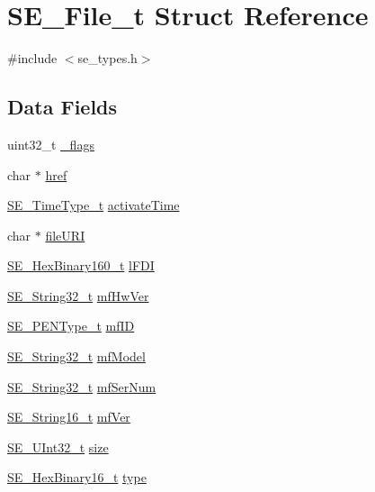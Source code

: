 \hypertarget{structSE__File__t}{}\section{S\+E\+\_\+\+File\+\_\+t Struct Reference}
\label{structSE__File__t}


{\ttfamily \#include $<$se\+\_\+types.\+h$>$}

\subsection*{Data Fields}
\begin{DoxyCompactItemize}
\item 
uint32\+\_\+t \hyperlink{group__File_gaf9fb522b583f585ebfa63bf9aae654c4}{\+\_\+flags}
\item 
char $\ast$ \hyperlink{group__File_ga4f649ba81f3ec3758585c829bffe909e}{href}
\item 
\hyperlink{group__TimeType_ga6fba87a5b57829b4ff3f0e7638156682}{S\+E\+\_\+\+Time\+Type\+\_\+t} \hyperlink{group__File_ga10cf0e5d17ce214712253641b664a0a4}{activate\+Time}
\item 
char $\ast$ \hyperlink{group__File_ga291723dcc840904ef8ca0ee385c935a3}{file\+U\+RI}
\item 
\hyperlink{group__HexBinary160_ga92b92aa55555bdb75f3a59060f2c1632}{S\+E\+\_\+\+Hex\+Binary160\+\_\+t} \hyperlink{group__File_ga74ca6e064ee6671f42955d17470e25b2}{l\+F\+DI}
\item 
\hyperlink{group__String32_gac9f59b06b168b4d2e0d45ed41699af42}{S\+E\+\_\+\+String32\+\_\+t} \hyperlink{group__File_ga1cd1a18ab1e17b4a045bebf80d68eaeb}{mf\+Hw\+Ver}
\item 
\hyperlink{group__PENType_ga75343bbeec563c431fef2977b4dfa4e9}{S\+E\+\_\+\+P\+E\+N\+Type\+\_\+t} \hyperlink{group__File_gadfaca088f863cdcf43485a271a8a481a}{mf\+ID}
\item 
\hyperlink{group__String32_gac9f59b06b168b4d2e0d45ed41699af42}{S\+E\+\_\+\+String32\+\_\+t} \hyperlink{group__File_ga5e0a19dba9edc6f4b68f377ef065b4b7}{mf\+Model}
\item 
\hyperlink{group__String32_gac9f59b06b168b4d2e0d45ed41699af42}{S\+E\+\_\+\+String32\+\_\+t} \hyperlink{group__File_ga0811fbd161a3bf54bb0b2c47aaac6d62}{mf\+Ser\+Num}
\item 
\hyperlink{group__String16_ga96799b35e03c3e6545eb138a7f879015}{S\+E\+\_\+\+String16\+\_\+t} \hyperlink{group__File_ga89d714f28592f9970532c15f4c5630e3}{mf\+Ver}
\item 
\hyperlink{group__UInt32_ga70bd4ecda3c0c85d20779d685a270cdb}{S\+E\+\_\+\+U\+Int32\+\_\+t} \hyperlink{group__File_ga19932bde03637ceb3778be45c83d6d26}{size}
\item 
\hyperlink{group__HexBinary16_gac040be0e918a360be6bcf5e8b8ad2c49}{S\+E\+\_\+\+Hex\+Binary16\+\_\+t} \hyperlink{group__File_gac0aab114d7b9752adb600099323cd594}{type}
\end{DoxyCompactItemize}


